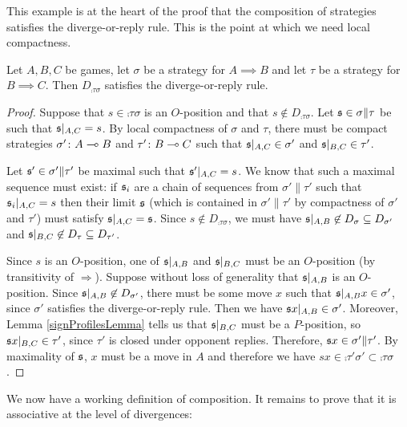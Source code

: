 \documentclass{article}
\begin{document}
This example is at the heart of the proof that the composition of strategies satisfies the diverge-or-reply rule.  This is the point at which we need local compactness.

\begin{proposition}
  Let $A,B,C$ be games, let $\sigma$ be a strategy for $A\implies B$ and let $\tau$ be a strategy for $B\implies C$.  Then $D_{\comp\tau\sigma}$ satisfies the diverge-or-reply rule.

  \begin{proof}
    Suppose that $s\in\comp\tau\sigma$ is an $O$-position and that $s\not\in D_{\comp\tau\sigma}$.  Let $\mathfrak s\in\sigma\|\tau$ be such that $\mathfrak s\vert_{A,C}=s$.  By local compactness of $\sigma$ and $\tau$, there must be compact strategies $\sigma'\colon A\multimap B$ and $\tau'\colon B\multimap C$ such that $\mathfrak s\vert_{A,C}\in\sigma'$ and $\mathfrak s\vert_{B,C}\in\tau'$.  
    
    Let $\mathfrak s'\in\sigma'\|\tau'$ be maximal such that $\mathfrak s'\vert_{A,C}=s$.  We know that such a maximal sequence must exist: if $\mathfrak s_i$ are a chain of sequences from $\sigma'\|\tau'$ such that $\mathfrak s_i\vert_{A,C}=s$ then their limit $\mathfrak s$ (which is contained in $\sigma'\|\tau'$ by compactness of $\sigma'$ and $\tau'$) must satisfy $\mathfrak s\vert_{A,C}=\mathfrak s$.  Since $s\not\in D_{\comp\tau\sigma}$, we must have $\mathfrak s\vert_{A,B}\not\in D_\sigma\subseteq D_{\sigma'}$ and $\mathfrak s\vert_{B,C}\not\in D_\tau\subseteq D_{\tau'}$.  
    
    Since $s$ is an $O$-position, one of $\mathfrak s\vert_{A,B}$ and $\mathfrak s\vert_{B,C}$ must be an $O$-position (by transitivity of $\Rightarrow$).  Suppose without loss of generality that $\mathfrak s\vert_{A,B}$ is an $O$-position.  Since $\mathfrak s\vert_{A,B}\not\in D_{\sigma'}$, there must be some move $x$ such that $\mathfrak s\vert_{A,B}x\in\sigma'$, since $\sigma'$ satisfies the diverge-or-reply rule.  Then we have $\mathfrak s x\vert_{A,B}\in\sigma'$.  Moreover, Lemma \ref{signProfilesLemma} tells us that $\mathfrak s\vert_{B,C}$ must be a $P$-position, so $\mathfrak s x\vert_{B,C}\in\tau'$, since $\tau'$ is closed under opponent replies.  Therefore, $\mathfrak s x\in\sigma'\|\tau'$.  By maximality of $\mathfrak s$, $x$ must be a move in $A$ and therefore we have $sx\in\comp{\tau'}{\sigma'}\subset\comp\tau\sigma$.
  \end{proof}
\end{proposition}

We now have a working definition of composition.  It remains to prove that it is associative at the level of divergences:
\end{document}
